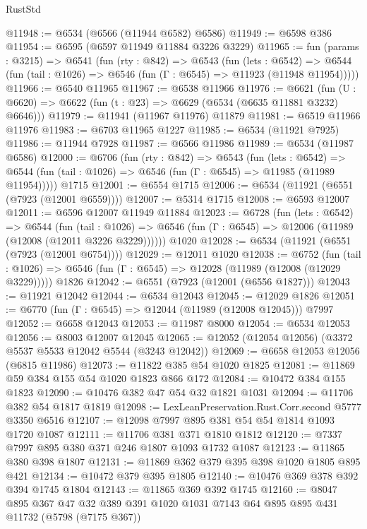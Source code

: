 \begin{lexlean}{RustStd}
\begin{coremodule}
@11948 := @6534 (@6566 (@11944 @6582) @6586)
@11949 := @6598 @386
@11954 := @6595 (@6597 @11949 @11884 @3226 @3229)
@11965 := fun (params : @3215) =>
  @6541
    (fun (rty : @842) =>
    @6543
      (fun (lets : @6542) =>
      @6544 (fun (tail : @1026) => @6546 (fun (Γ : @6545) => @11923 (@11948 @11954)))))
@11966 := @6540 @11965
@11967 := @6538 @11966
@11976 := @6621
    (fun (U : @6620) => @6622 (fun (t : @23) => @6629 (@6534 (@6635 @11881 @3232) @6646)))
@11979 := @11941 (@11967 @11976) @11879
@11981 := @6519 @11966 @11976
@11983 := @6703 @11965 @1227
@11985 := @6534 (@11921 @7925)
@11986 := @11944 @7928
@11987 := @6566 @11986
@11989 := @6534 (@11987 @6586)
@12000 := @6706
    (fun (rty : @842) =>
    @6543
      (fun (lets : @6542) =>
      @6544 (fun (tail : @1026) => @6546 (fun (Γ : @6545) => @11985 (@11989 @11954)))))
    @1715
@12001 := @6554 @1715
@12006 := @6534 (@11921 (@6551 (@7923 (@12001 @6559))))
@12007 := @5314 @1715
@12008 := @6593 @12007
@12011 := @6596 @12007 @11949 @11884
@12023 := @6728
    (fun (lets : @6542) =>
    @6544
      (fun (tail : @1026) =>
      @6546 (fun (Γ : @6545) => @12006 (@11989 (@12008 (@12011 @3226 @3229))))))
    @1020
@12028 := @6534 (@11921 (@6551 (@7923 (@12001 @6754))))
@12029 := @12011 @1020
@12038 := @6752
    (fun (tail : @1026) => @6546 (fun (Γ : @6545) => @12028 (@11989 (@12008 (@12029 @3229)))))
    @1826
@12042 := @6551 (@7923 (@12001 (@6556 @1827)))
@12043 := @11921 @12042
@12044 := @6534 @12043
@12045 := @12029 @1826
@12051 := @6770 (fun (Γ : @6545) => @12044 (@11989 (@12008 @12045))) @7997
@12052 := @6658 @12043
@12053 := @11987 @8000
@12054 := @6534 @12053
@12056 := @8003 @12007 @12045
@12065 := @12052 (@12054 @12056) (@3372 @5537 @5533 @12042 @5544 (@3243 @12042))
@12069 := @6658 @12053 @12056 (@6815 @11986)
@12073 := @11822 @385 @54 @1020 @1825
@12081 := @11869 @59 @384 @155 @54 @1020 @1823 @866 @172
@12084 := @10472 @384 @155 @1823
@12090 := @10476 @382 @47 @54 @32 @1821 @1031
@12094 := @11706 @382 @54 @1817 @1819
@12098 := LexLeanPreservation.Rust.Corr.second @5777 @3350 @6516
@12107 := @12098 @7997 @895 @381 @54 @54 @1814 @1093 @1720 @1087
@12111 := @11706 @381 @371 @1810 @1812
@12120 := @7337 @7997 @895 @380 @371 @246 @1807 @1093 @1732 @1087
@12123 := @11865 @380 @398 @1807
@12131 := @11869 @362 @379 @395 @398 @1020 @1805 @895 @421
@12134 := @10472 @379 @395 @1805
@12140 := @10476 @369 @378 @392 @394 @1745 @1804
@12143 := @11865 @369 @392 @1745
@12160 := @8047
    @895
    @367
    @47
    @32
    @389
    @391
    @1020
    @1031
    @7143
    @64
    @895
    @895
    @431
    @11732
    (@5798 (@7175 @367))

\end{coremodule}
\end{lexlean}
